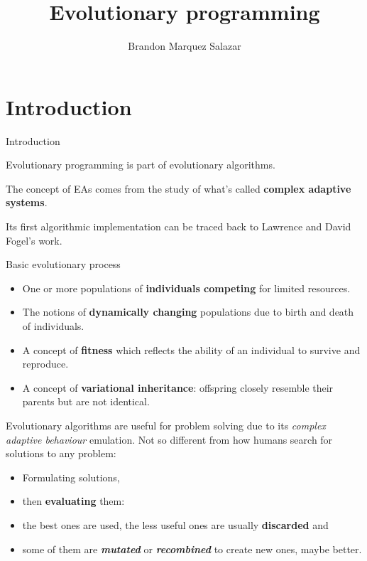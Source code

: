 \documentclass[10pt,dvipsnames]{beamer}
\author{%
Brandon Marquez Salazar
}
\title{%
  Evolutionary programming
}
\begin{document}
\maketitle
\justifying

  \section*{Introduction}
  \begin{frame}{Introduction}
    \begin{blur}

      Evolutionary programming is part of evolutionary algorithms.

      The concept of EAs comes from the study of what's called
      \textbf{complex adaptive systems}. 

      Its first algorithmic implementation can be traced back to
      Lawrence and David Fogel's work.

    \end{blur}
  \end{frame}


  \begin{frame}{Basic evolutionary process}
  \begin{blur}
    \begin{itemize}
      \item One or more populations of \textbf{individuals competing} for
      limited resources.
      \item The notions of \textbf{dynamically changing} populations due
      to birth and death of individuals.
      \item A concept of \textbf{fitness} which reflects the ability of
      an individual to survive and reproduce.
      \item A concept of \textbf{variational inheritance}: offspring
      closely resemble their parents but are not identical.
    \end{itemize}
  \end{blur}
  \end{frame}

  \begin{frame}{}
  \begin{blur}
    Evolutionary algorithms are useful for problem solving due to its
    \textit{complex adaptive behaviour} emulation. Not so different from
    how humans search for solutions to any problem:

    \begin{itemize}
      \item Formulating solutions,
      \item then \textbf{evaluating} them:
      \item the best ones are used, the less useful ones are usually
      \textbf{discarded} and
      \item some of them are \textbf{\itshape mutated} or
      \textbf{\itshape recombined} to create new ones, maybe better.
    \end{itemize}
  \end{blur}
  \end{frame}
\end{document}
